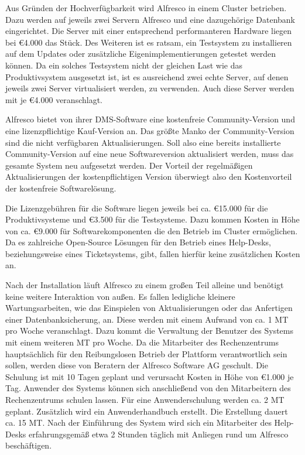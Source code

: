 Aus Gründen der Hochverfügbarkeit wird Alfresco in einem Cluster betrieben. Dazu werden auf jeweils zwei Servern Alfresco und eine dazugehörige Datenbank eingerichtet. Die Server mit einer entsprechend performanteren Hardware liegen bei \euro 4.000 das Stück. Des Weiteren ist es ratsam, ein Testsystem zu installieren auf dem Updates oder zusätzliche Eigenimplementierungen getestet werden können. Da ein solches Testsystem nicht der gleichen Last wie das Produktivsystem ausgesetzt ist, ist es ausreichend zwei echte Server, auf denen jeweils zwei Server virtualisiert werden, zu verwenden. Auch diese Server werden mit je \euro 4.000 veranschlagt.

Alfresco bietet von ihrer DMS-Software eine kostenfreie Community-Version und eine lizenzpflichtige Kauf-Version an. Das größte Manko der Community-Version sind die nicht verfügbaren Aktualisierungen. Soll also eine bereits installierte Community-Version auf eine neue Softwareversion aktualisiert werden, muss das gesamte System neu aufgesetzt werden. Der Vorteil der regelmäßigen Aktualisierungen der kostenpflichtigen Version überwiegt also den Kostenvorteil der kostenfreie Softwarelösung.

Die Lizenzgebühren für die Software liegen jeweils bei ca. \euro 15.000 für die Produktivsysteme und \euro 3.500 für die Testsysteme. Dazu kommen Kosten in Höhe von ca. \euro 9.000 für Softwarekomponenten die den Betrieb im Cluster ermöglichen. Da es zahlreiche Open-Source Lösungen für den Betrieb eines Help-Desks, beziehungsweise eines Ticketsystems, gibt, fallen hierfür keine zusätzlichen Kosten an.

Nach der Installation läuft Alfresco zu einem großen Teil alleine und benötigt keine weitere Interaktion von außen. Es fallen ledigliche kleinere Wartungsarbeiten, wie das Einspielen von Aktualisierungen oder das Anfertigen einer Datenbanksicherung, an. Diese werden mit einem Aufwand von ca. 1 MT pro Woche veranschlagt. Dazu kommt die Verwaltung der Benutzer des Systems mit einem weiteren MT pro Woche. Da die Mitarbeiter des Rechenzentrums hauptsächlich für den Reibungslosen Betrieb der Plattform verantwortlich sein sollen, werden diese von Beratern der Alfresco Software AG geschult. Die Schulung ist mit 10 Tagen geplant und verursacht Kosten in Höhe von \euro 1.000 je Tag. Anwender des Systems können sich anschließend von den Mitarbeitern des Rechenzentrums schulen lassen. Für eine Anwenderschulung werden ca. 2 MT geplant. Zusätzlich wird ein Anwenderhandbuch erstellt. Die Erstellung dauert ca. 15 MT. Nach der Einführung des System wird sich ein Mitarbeiter des Help-Desks erfahrungsgemäß etwa 2 Stunden täglich mit Anliegen rund um Alfresco beschäftigen.

